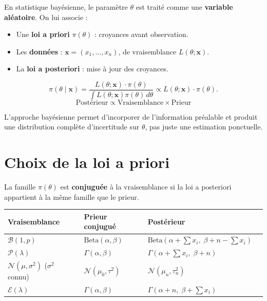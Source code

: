 \begin{definition}
En statistique bay\'esienne, le param\`etre $\theta$ est trait\'e comme une \textbf{variable al\'eatoire}. On lui associe :
\begin{itemize}
\item Une \textbf{loi a priori} $\pi(\theta)$ : croyances avant observation.
\item Les \textbf{donn\'ees} : $\mathbf{x}=(x_1,\ldots,x_n)$, de vraisemblance $L(\theta;\mathbf{x})$.
\item La \textbf{loi a posteriori} : mise \`a jour des croyances.
\end{itemize}
\end{definition}

\begin{theoreme}
\[
\pi(\theta\mid\mathbf{x}) = \frac{L(\theta;\mathbf{x})\cdot\pi(\theta)}{\int L(\theta;\mathbf{x})\pi(\theta)\,d\theta} \propto L(\theta;\mathbf{x})\cdot\pi(\theta).
\]
\[
\boxed{\text{Post\'erieur} \propto \text{Vraisemblance} \times \text{Prieur}}
\]
\end{theoreme}

\begin{intuition}
L'approche bay\'esienne permet d'incorporer de l'information pr\'ealable et produit une distribution compl\`ete d'incertitude sur $\theta$, pas juste une estimation ponctuelle.
\end{intuition}

\section{Choix de la loi a priori}

\begin{definition}
La famille $\pi(\theta)$ est \textbf{conjugu\'ee} \`a la vraisemblance si la loi a posteriori appartient \`a la m\^eme famille que le prieur.
\end{definition}

\begin{center}
\begin{tabular}{llll}
\toprule
\textbf{Vraisemblance} & \textbf{Prieur conjugu\'e} & \textbf{Post\'erieur} \\
\midrule
$\mathcal{B}(1,p)$ & $\mathrm{Beta}(\alpha,\beta)$ & $\mathrm{Beta}(\alpha+\sum x_i,\;\beta+n-\sum x_i)$ \\
$\mathcal{P}(\lambda)$ & $\Gamma(\alpha,\beta)$ & $\Gamma(\alpha+\sum x_i,\;\beta+n)$ \\
$\mathcal{N}(\mu,\sigma^2)$ ($\sigma^2$ connu) & $\mathcal{N}(\mu_0,\tau^2)$ & $\mathcal{N}(\mu_n,\tau_n^2)$ \\
$\mathcal{E}(\lambda)$ & $\Gamma(\alpha,\beta)$ & $\Gamma(\alpha+n,\;\beta+\sum x_i)$ \\
\bottomrule
\end{tabular}
\end{center}

